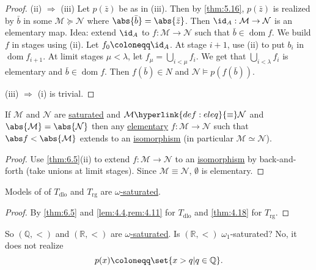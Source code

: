 \documentclass{article}
\let\models\vDash
\DeclareMathOperator{\dom}{dom}
\begin{document}
\begin{proof}
  (ii) $\Rightarrow$ (iii) Let $p(\bar z)$ be as in (iii). Then by \cref{thm:5.16}, $p(\bar z)$ is realized by $\bar b$ in some $\mathcal M \succcurlyeq \mathcal N$ where $\abs{\bar b} = \abs{\bar z}$. Then $\id_A: \mathcal{M} \to \mathcal{N}$ is an elementary map. Idea: extend $\id_A$ to $f: \mathcal{M} \to \mathcal{N}$ such that $\bar b \in \dom f$. We build $f$ in stages using (ii). Let $f_0 \coloneqq \id_A$. At stage $i+1$, use (ii) to put $b_i$ in $\dom f_{i+1}$. At limit stages  $\mu < \lambda$, let $f_\mu = \bigcup_{i < \mu} f_i$. We get that $\bigcup_{i < \lambda}f_i $ is elementary and $\bar b \in \dom f$. Then $f(\bar b) \in N$ and $\mathcal{N} \models p(f(\bar b))$.

  (iii) $\Rightarrow$ (i) is trivial.
\end{proof}
\begin{ncor}\label{cor:6.6}
  If $\mathcal{M}$ and $\mathcal{N}$ are \hyperlink{def:sat}{saturated} and $\mathcal{M} \hyperlink{def:eleq}{\equiv} \mathcal{N}$ and $\abs{\mathcal{M}} = \abs{\mathcal{N}}$ then any \hyperlink{def:elmap}{elementary} $f: \mathcal{M} \to \mathcal{N}$ such that $\abs f < \abs{\mathcal{M}}$ extends to an \hyperlink{def:iso}{isomorphism} (in particular \hyperlink{def:iso}{$\mathcal{M} \simeq \mathcal{N}$}).
\end{ncor}
\begin{proof}
  Use \cref{thm:6.5}(ii) to extend $f: \mathcal{M} \to \mathcal{N}$ to an \hyperlink{def:iso}{isomorphism} by back-and-forth (take unions at limit stages).
  Since $\mathcal M \equiv \mathcal N$, $\emptyset$ is elementary.
\end{proof}
\begin{ncor}\label{cor:6.7}
  Models of of $T_{\text{dlo}}$ and $T_{\text{rg}}$ are \hyperlink{def:sat}{$\omega$-saturated}.
\end{ncor}
\begin{proof}
  By \cref{thm:6.5} and \cref{lem:4.4,rem:4.11} for $T_{\text{dlo}}$ and \cref{thm:4.18} for $T_{\text{rg}}$.
\end{proof}

So $(\mathbb{Q}, <)$ and $(\mathbb{R}, <)$ are \hyperlink{def:sat}{$\omega$-saturated}.
Is $(\mathbb{R}, <)$ $\omega_1$-saturated? No, it does not realize
\begin{equation*}p(x) \coloneqq \set{x > q | q \in \mathbb{Q}}.\end{equation*}
\end{document}
